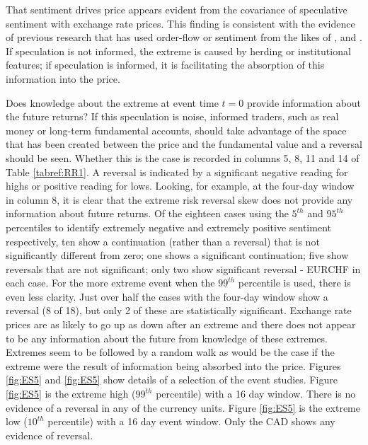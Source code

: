 \documentclass[ijfs,article,submit,oneauthor,pdftex,10pt,a4paper]{mdpi}
\begin{document}
That sentiment drives price appears evident from the covariance of speculative sentiment with exchange rate prices. This finding is consistent with the evidence of previous research that has used order-flow or sentiment from the likes of \citet{Evans2002Order}, \citet{FuturesSanders} and \citet{FuturesWang}. If speculation is not informed, the extreme is caused by herding or institutional features; if speculation is informed, it is facilitating the absorption of this information into the price. 

Does knowledge about the extreme at event time $t = 0$ provide information about the future returns?  If this speculation is noise, informed traders, such as real money or long-term fundamental accounts, should take advantage of the space that has been created between the price and the fundamental value and a reversal should be seen.  Whether this is the case is recorded in columns 5, 8, 11 and 14 of Table \ref{tabref:RR1}. A reversal is indicated by a significant negative reading for highs or positive reading for lows.   Looking, for example, at the four-day window in column 8, it is clear that the extreme risk reversal skew does not provide any information about future returns.  Of the eighteen cases using the $5^{th}$ and $95^{th}$ percentiles to identify extremely negative and extremely positive sentiment respectively, ten show a continuation (rather than a reversal) that is not significantly different from zero; one shows a significant continuation; five show reversals that are not significant; only two show significant reversal - EURCHF in each case.  For the more extreme event when the $99^{th}$ percentile is used, there is even less clarity.  Just over half the cases with the four-day window show a reversal (8 of 18), but only 2 of these are statistically significant. Exchange rate prices are as likely to go up as down after an extreme and there does not appear to be any information about the future from knowledge of these extremes. Extremes seem to be followed by a random walk as would be the case if the extreme were the result of information being absorbed into the price.  Figures \ref{fig:ES5} and \ref{fig:ES5} show details of a selection of the event studies.  Figure \ref{fig:ES5} is the extreme high ($99^{th}$ percentile) with a 16 day window. There is no evidence of a reversal in any of the currency units.   Figure \ref{fig:ES5} is the extreme low ($10^{th}$ percentile) with a 16 day event window.  Only the CAD shows any evidence of reversal. 
\end{document}
